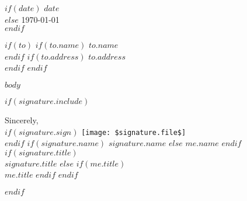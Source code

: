 \documentclass[11pt]{letter}
\begin{document}
\thispagestyle{firstpage}

{\bodyFont

  \begin{letter}

    $if(date)$
    $date$ \\
    $else$
    \today \\
    $endif$

    $if(to)$
    $if(to.name)$
    $to.name$ \\
    $endif$
    $if(to.address)$
    $to.address$ \\
    $endif$
    $endif$

    $body$

    $if(signature.include)$
    \closing{
      Sincerely,\\
      \vspace{0.1in}
      $if(signature.sign)$
      \texttt{[image: \$signature.file\$]} \\
      $endif$
      $if(signature.name)$
      $signature.name$
      $else$
      $me.name$
      $endif$
      $if(signature.title)$
      \\
      $signature.title$
      $else$
      $if(me.title)$
      \\
      $me.title$
      $endif$
      $endif$
    }
    $endif$
  \end{letter}
}
\end{document}
